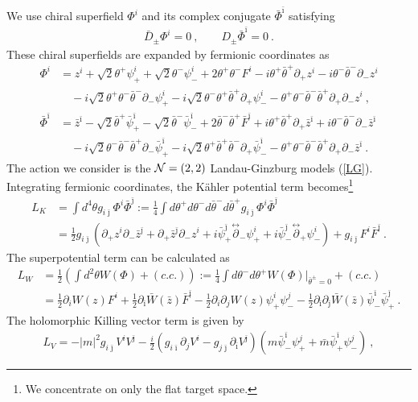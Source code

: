 \documentclass[a4paper,12pt]{article}
\numberwithin{equation}{section}
\newcommand{\del}{\partial}
\newcommand{\ib}{\bar{\imath}}
\newcommand{\jb}{\bar{\jmath}}
\newcommand{\mb}{\bar{m}}
\newcommand{\nn}{\nonumber\\}
\newcommand{\ta}{\theta}
\newcommand{\tb}{\bar{\theta}}
\newcommand{\dlr}{\overset{\leftrightarrow}{\del}}
\newcommand{\Db}{\bar{D}}
\newcommand{\psb}{\bar{\psi}}
\newcommand{\Phb}{\bar{\Phi}}
\newcommand{\Fb}{\bar{F}}
\newcommand{\Wb}{\bar{W}}
\newcommand{\pha}{z}
\newcommand{\phb}{\bar{z}}
\begin{document}
We use chiral superfield $\Phi^{i}$ and its complex 
conjugate $\Phb^{\ib}$ satisfying
\begin{align}
 \Db_{\pm} \Phi^{i}=0~,\qquad  D_{\pm} \Phb^{\ib}=0~.
\end{align}
These chiral superfields are expanded by fermionic coordinates as
\begin{align}
 \Phi^{i} &=\pha^{i}+\sqrt2 \ta^{+}\psi_{+}^{i}+\sqrt2 
                  \ta^{-}\psi_{-}^{i}+2\ta^{+}\ta^{-}F^{i}
      -i\ta^{+}\tb^{+}\del_{+}\pha^{i}-i\ta^{-}\tb^{-}\del_{-}\pha^{i}\nn
  &\quad   -i\sqrt2 \ta^{+}\ta^{-}\tb^{-}\del_{-}\psi_{+}^{i}
     -i\sqrt2 \ta^{-}\ta^{+}\tb^{+}\del_{+}\psi_{-}^{i}
     -\ta^{+}\ta^{-}\tb^{-}\tb^{+}\del_{+}\del_{-}\pha^{i}~,\nn
 \Phb^{\ib}&=\phb^{\ib}-\sqrt2 \tb^{+}\psb_{+}^{\ib}-\sqrt2 
                  \tb^{-}\psb_{-}^{\ib}+2\tb^{-}\tb^{+}\Fb^{\ib}
      +i\ta^{+}\tb^{+}\del_{+}\phb^{\ib}
      +i\ta^{-}\tb^{-}\del_{-}\phb^{\ib}\nn
  &\quad   -i\sqrt2 \ta^{-}\tb^{-}\tb^{+}\del_{-}\psb_{+}^{\ib}
     -i\sqrt2 \ta^{+}\tb^{+}\tb^{-}\del_{+}\psb_{-}^{\ib}
     -\ta^{+}\ta^{-}\tb^{-}\tb^{+}\del_{+}\del_{-}\phb^{\ib}~.
\end{align}
The action we consider is the ${\cal N} =(2,2)$  Landau-Ginzburg
models (\ref{LG}).  Integrating fermionic
coordinates, the K\"ahler potential term becomes\footnote{
We concentrate on only the flat target space.}
\begin{align}
 L_K&=\int d^4\ta g_{i\jb}\Phi^{i}\Phb^{\jb} :=
     \frac14 \int d\ta^{+} d\ta^{-} d \tb^{-}
                  d\tb^{+}g_{i\jb}\Phi^{i}\Phb^{\jb}\nn
 &=\frac12 g_{i\jb} (\del_+ \pha^{i}\del_- \phb^{\jb} 
                   + \del_+ \phb^{\jb}\del_- \pha^{i}
  +i\psb_{+}^{\jb} \dlr_{-}\psi_{+}^{i} +i\psb_{-}^{\jb} \dlr_{+}\psi_{-}^{i})
  +g_{i\jb}F^{i}\Fb^{\jb}~.
\end{align}
The superpotential term can be calculated as 
\begin{align}
 L_W&= \frac12 \left(\int d^2\ta W(\Phi)+(c.c.)\right)
 :=\frac14 \int d\ta^{-}d\ta^{+}W(\Phi)|_{\tb^{\pm}=0}+(c.c.)\nn
 &=\frac12\del_{i} W(\pha) F^{i} +\frac12\del_{\ib} \Wb(\phb)\Fb^{\ib} 
-\frac12\del_{i}\del_{j}W(\pha)\psi_{+}^{i}\psi_{-}^{j}
-\frac12\del_{\ib}\del_{\jb}\Wb(\phb)\psb_{-}^{\ib}\psb_{+}^{\jb}~.
\end{align}
The holomorphic Killing vector term is given by 
\cite{Bagger:1982fn,Alvarez-Gaume:1983ab,Gates:1984py}
\begin{align}
 L_{V}=-|m|^2 g_{i\jb}V^{i}V^{\jb}
 -\frac{i}{2}(g_{i\ib}\del_{j}V^{i}-g_{j\jb}\del_{\ib}V^{\jb})
  (m\psb_{-}^{\ib}\psi_{+}^{j}+\mb\psb_{+}^{\ib}\psi_{-}^{j}) ~,
\end{align}
\end{document}
